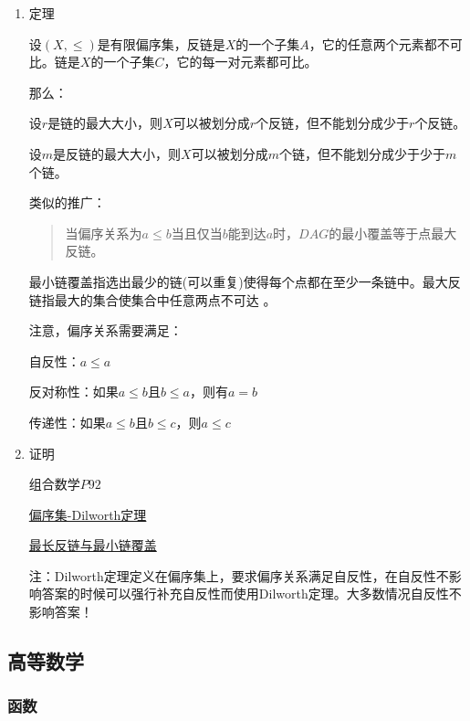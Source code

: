 \documentclass[11pt]{article}
\begin{document}
\begin{enumerate}
\item 定理
\label{sec-1-4-1-1}

设\((X,\leq)\)是有限偏序集，反链是\(X\)的一个子集\(A\)，它的任意两个元素都不可比。链是\(X\)的一个子集\(C\)，它的每一对元素都可比。

那么：

设\(r\)是链的最大大小，则\(X\)可以被划分成\(r\)个反链，但不能划分成少于\(r\)个反链。

设\(m\)是反链的最大大小，则\(X\)可以被划分成\(m\)个链，但不能划分成少于少于\(m\)个链。

类似的推广：

\begin{quote}
当偏序关系为\(a \leq b\)当且仅当\(b\)能到达\(a\)时，\(DAG\)的最小覆盖等于点最大反链。
\end{quote}

最小链覆盖指选出最少的链(可以重复)使得每个点都在至少一条链中。最大反链指最大的集合使集合中任意两点不可达 。


注意，偏序关系需要满足：

自反性：\(a \leq a\)

反对称性：如果\(a \leq b\)且\(b \leq a\)，则有\(a = b\)

传递性：如果\(a \leq b\)且\(b \leq c\)，则\(a \leq c\)

\item 证明
\label{sec-1-4-1-2}

组合数学\(P92\)

\href{http://blog.csdn.net/xuzengqiang/article/details/7266034}{偏序集-Dilworth定理}

\href{http://vfleaking.blog.163.com/blog/static/1748076342012918105514527}{最长反链与最小链覆盖}

注：Dilworth定理定义在偏序集上，要求偏序关系满足自反性，在自反性不影响答案的时候可以强行补充自反性而使用Dilworth定理。大多数情况自反性不影响答案！
\end{enumerate}
\subsection{高等数学}
\label{sec-1-5}
\subsubsection{函数}
\label{sec-1-5-1}
\end{document}
